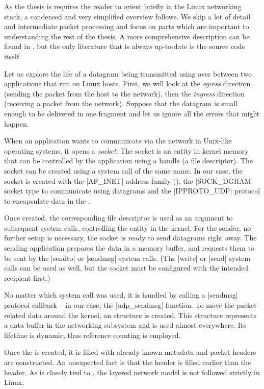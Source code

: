 As the thesis is requires the reader to orient briefly in the Linux networking stack,
a condensed and very simplified overview follows. We skip a lot of detail and
intermediate packet processing and focus on parts which are important to
understanding the rest of the thesis. A more comprehensive description can be
found in \cite{lkn-iat}, but the only literature that is always up-to-date is
the source code itself.

Let us explore the life of a datagram being transmitted using  over
 between two applications that run on Linux hosts. First, we will look
at the \emph{egress} direction (sending the packet from the host to the
network), then the \emph{ingress} direction (receiving a packet from the
network). Suppose that the datagram is small enough to be delivered
in one  fragment and let us ignore all the errors that might happen.

When an application wants to communicate via the network in Unix-like operating
systems, it opens a \emph{socket}. The socket is an entity in kernel memory that
can be controlled by the application using a handle (a file descriptor). The
socket can be created using a system call of
the same name. In our case, the socket is created with the \macro|AF_INET| address
family (), the \macro|SOCK_DGRAM| socket type to communicate using
datagrams and the \macro|IPPROTO_UDP| protocol to encapsulate data in the .

Once created, the corresponding file descriptor is used as an argument to
subsequent system calls, controlling the entity in the kernel. For the sender,
no further setup is necessary, the socket is ready to send datagrams right away.
The sending application prepares the data in a memory buffer, and requests them
to be sent by the \fnc|sendto| or \fnc|sendmsg| system calls. (The \fnc|write|
or \fnc|send| system calls can be used as well, but the socket must be
configured with the intended recipient first.)

No matter which system call was used, it is handled by calling a \fnc|sendmsg|
protocol callback -- in our case, the \fnc|udp_sendmsg| function. To move
the packet-related data around the kernel, an \skb{} structure is created. This
structure represents a data buffer in the networking subsystem and is used
almost everywhere. Its lifetime is dynamic, thus reference counting is
employed.

Once the \skb{} is created, it is filled with already known metadata and packet
headers are constructed. An unexpected fact is that the  header is
filled earlier than the  header. As  is closely tied to
, the layered network model is not followed strictly in Linux.

